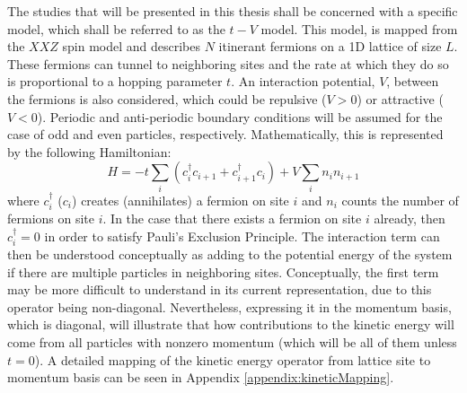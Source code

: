The studies that will be presented in this thesis shall be concerned with a specific model, which shall be referred to as the $t-V$ model. This model, is mapped from the $XXZ$ spin model and describes $N$ itinerant fermions on a 1D lattice of size $L$. These fermions can tunnel to neighboring sites and the rate at which they do so is proportional to a hopping parameter $t$. An interaction potential, $V$, between the fermions is also considered, which could be repulsive ($V > 0$) or attractive ($V < 0$). Periodic and anti-periodic boundary conditions will be assumed for the case of odd and even particles, respectively. Mathematically, this is represented by the following Hamiltonian:
%
\begin{equation}
H = -t \sum_{i} \left ( c_{i}^{\dag} c_{i+1} + c_{i+1}^{\dag} c_{i} \right )+ V \sum_{i} n_i n_{i+1}   
\label{eq:t-VHamiltonian}
\end{equation}
%
where $c_{i}^{\dag}$ ($c_{i}$) creates (annihilates) a fermion on site $i$ and $n_{i}$ counts the number of fermions on site $i$. In the case that there exists a fermion on site $i$ already, then $c_{i}^{\dag} = 0$ in order to satisfy Pauli's Exclusion Principle. The interaction term can then be understood conceptually as adding to the potential energy of the system if there are multiple particles in neighboring sites. Conceptually, the first term may be more difficult to understand in its current representation, due to this operator being non-diagonal. Nevertheless, expressing it in the momentum basis, which is diagonal, will illustrate that how contributions to the kinetic energy will come from all particles with nonzero momentum (which will be all of them unless $t=0$). A detailed mapping of the kinetic energy operator from lattice site to momentum basis can be seen in Appendix \ref{appendix:kineticMapping}.

